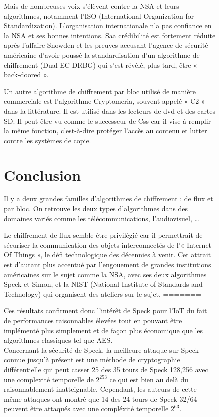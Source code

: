 \begin{figure}[!h]
			Mais de nombreuses voix s'élèvent contre la NSA et leurs algorithmes, notamment l'ISO (International Organization for Standardization).
			L'organisation internationale n'a pas confiance en la NSA et ses bonnes intentions.
			Saa crédibilité est fortement réduite après l'affaire Snowden et les preuves accusant l'agence de sécurité américaine d'avoir poussé la standardisation d'un algorithme de chiffrement (Dual EC DRBG) qui s'est révélé, plus tard, être « back-doored »\cite{NSABackdoor}.
			
			Un autre algorithme de chiffrement par bloc utilisé de manière commerciale est l'algorithme Cryptomeria, souvent appelé « C2 » dans la littérature.
			Il est utilisé dans les lecteurs de dvd et des cartes SD. Il peut être vu comme le successeur de Css car il vise à remplir la même fonction, c'est-à-dire protéger l'accès au contenu et lutter contre les systèmes de copie.
			
			\section{Conclusion}
			
			Il y a deux grandes familles d'algorithmes de chiffrement : de flux et par bloc.
			On retrouve les deux types d'algorithmes dans des domaines variés comme les télécommunications, l'audiovisuel, \dots
			
			Le chiffrement de flux semble être privilégié car il permettrait de sécuriser la communication des objets interconnectés de l'« Internet Of Things », le défi technologique des décennies à venir.
			Cet attrait est d'autant plus accentué par l'engouement de grandes institutions américaines sur le sujet comme la NSA, avec ses deux algorithmes Speck et Simon, et la NIST (National Institute of Standards and Technology) qui organisent des ateliers sur le sujet.
=======

			Ces résultats confirment donc l'intérêt de Speck pour l'IoT du fait de performances
			raisonnables élevées tout en pouvant être implémenté plus simplement et de façon
			plus économique que	les algorithmes classiques tel que AES.  \\

			Concernant la sécurité de Speck, la meilleure attaque sur Speck connue
			jusqu'à présent est une méthode de cryptographie différentielle qui peut
			casser 25 des 35 tours de Speck 128,256 avec une complexité temporelle de
			$2^253$ \cite{speck_attack} ce qui est bien au delà du raisonnablement inatteignable.
			Cependant, les auteurs de cette même attaques ont montré que 14 des 24
			tours de Speck 32/64 peuvent être attaqués avec une compléxité temporelle $2^63$. \\



\end{figure}
